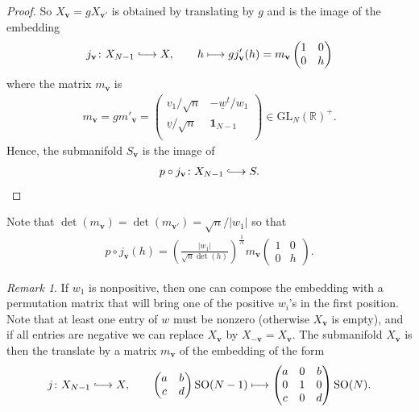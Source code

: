 \documentclass[a4paper,11pt]{amsart} %
\newcommand{\8}{\infty}
\newcommand{\id}{\mathbf{1}}
\newcommand{\wud}{\underline{w}}
\newcommand{\vud}{\underline{v}}
\newcommand{\vbf}{\mathbf{v}}
\newcommand{\SO}{\mathrm{SO}}
\newcommand{\GL}{\mathrm{GL}}
\newcommand{\R}{\mathbb{R}}
\newcommand{\hooklongrightarrow}{\lhook\joinrel\longrightarrow}
\theoremstyle{mytheoremstyle}
\theoremstyle{remark}
\newtheorem{rmk}{Remark}[section]
\numberwithin{equation}{section}
\begin{document}
\begin{proof}
So $X_{\vbf}=gX_{\vbf'}$ is obtained by translating by $g$ and is the image of the embedding
\begin{align}
    j_{\vbf} \colon X_{N-1} \hooklongrightarrow X, \qquad h \longmapsto gj'_\vbf(h)=m_\vbf\begin{pmatrix}
        1 & 0 \\ 0 & h
    \end{pmatrix}
\end{align}
where the matrix $m_\vbf$ is
\begin{align}
    m_{\vbf} = gm'_\vbf=\begin{pmatrix} 
    v_1/\sqrt{n} & -\wud^t/w_1 \\
 \vud/\sqrt{n} & \id_{N-1} \\
    \end{pmatrix} \in \GL_N(\R)^+.
\end{align}
Hence, the submanifold $S_\vbf$ is the image of
\begin{align}
    p \circ j_\vbf \colon X_{N-1} \hooklongrightarrow S. 
\end{align}
\end{proof}
Note that $\det(m_\vbf)=\det(m_{\vbf'})=\sqrt{n}/\vert w_1 \vert$ so that
\begin{align}
p \circ j_{\vbf}(h)=\left (\frac{\vert w_1 \vert}{\sqrt{n}\det(h)}\right )^\frac{1}{N} m_\vbf\begin{pmatrix}
        1 & 0 \\ 0 & h
    \end{pmatrix}.
\end{align}
\begin{rmk}
    If $w_1$ is nonpositive, then one can compose the embedding with a permutation matrix that will bring one of the positive $w_i$'s in the first position. Note that at least one entry of $w$ must be nonzero (otherwise $X_\vbf$ is empty), and if all entries are negative we can replace $X_\vbf$ by $X_{-\vbf}=X_\vbf$. The submanifold $X_\vbf$ is then the translate by a matrix $m_\vbf$ of the embedding of the form
    \begin{align}
    j \colon X_{N-1} \hooklongrightarrow X, \qquad
    \begin{pmatrix}
        a & b \\ c & d
    \end{pmatrix}\SO(N-1)  \longmapsto \begin{pmatrix}a & 0 & b \\ 0 & 1 & 0 \\ c & 0 & d
    \end{pmatrix}\SO(N).
\end{align}
\end{rmk}
\end{document}
